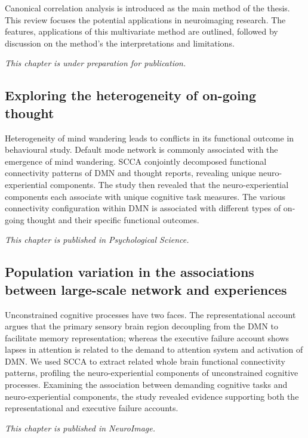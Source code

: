 Canonical correlation analysis is introduced as the main method of the thesis. This review focuses the potential applications in neuroimaging research. The features, applications of this multivariate method are outlined, followed by discussion on the method's the interpretations and limitations. 

\textit{This chapter is under preparation for publication. } 

\subsection*{Exploring the heterogeneity of on-going thought}
Heterogeneity of mind wandering leads to conflicts in its functional outcome in behavioural study. Default mode network is commonly associated with the emergence of mind wandering. SCCA conjointly decomposed functional connectivity patterns of DMN and thought reports, revealing unique neuro-experiential components. The study then revealed that the neuro-experiential components each associate with unique cognitive task measures. The various connectivity configuration within DMN is associated with different types of on-going thought and their specific functional outcomes.

\textit{This chapter is published in Psychological Science.}

\subsection*{Population variation in the associations between large-scale network and experiences}
Unconstrained cognitive processes have two faces. The representational account argues that the primary sensory brain region decoupling from the DMN to facilitate memory representation; whereas the executive failure account shows lapses in attention is related to the demand to attention system and activation of DMN. We used SCCA to extract related whole brain functional connectivity patterns, profiling the neuro-experiential components of unconstrained cognitive processes. Examining the association between demanding cognitive tasks and neuro-experiential components, the study revealed evidence supporting both the representational and executive failure accounts.

\textit{This chapter is published in NeuroImage.}

